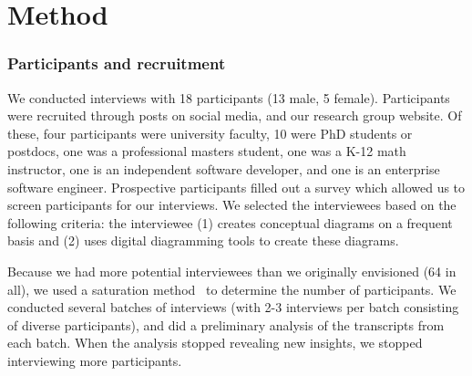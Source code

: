 

\section{Method}

\subsubsection{Participants and recruitment} 
We conducted interviews with 18 participants (13 male, 5 female). Participants were recruited through posts on social media, and our research group website. Of these, four participants were university faculty, 10 were PhD students or postdocs, one was a professional masters student, one was a K-12 math instructor, one is an independent software developer, and one is an enterprise software engineer. Prospective participants filled out a survey which allowed us to screen participants for our interviews. We selected the interviewees based on the following criteria: the interviewee (1) creates conceptual diagrams on a frequent basis and (2) uses digital diagramming tools to create these diagrams. 

Because we had more potential interviewees than we originally envisioned (64 in all), we used a saturation method~\cite{socialResearchMethods} to determine the number of participants. We conducted several batches of interviews (with 2-3 interviews per batch consisting of diverse participants), and did a preliminary analysis of the transcripts from each batch. When the analysis stopped revealing new insights, we stopped interviewing more participants. 


